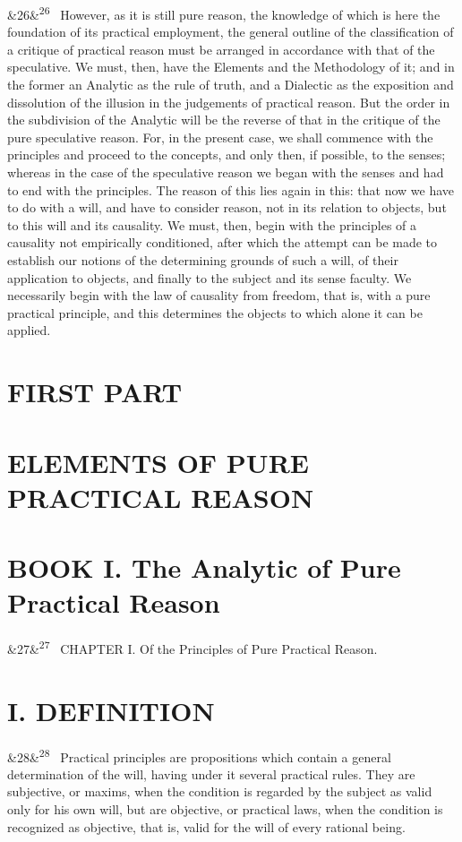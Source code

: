\documentclass[12pt]{article}
\newcommand{\para}[1][]{\par\noindent\ifx&#1&\else\textsuperscript{\footnotesize #1}~\fi}
\begin{document}
\para[26] However, as it is still pure reason, the knowledge of which is here the foundation of its practical employment, the general outline of the classification of a critique of practical reason must be arranged in accordance with that of the speculative. We must, then, have the Elements and the Methodology of it; and in the former an Analytic as the rule of truth, and a Dialectic as the exposition and dissolution of the illusion in the judgements of practical reason. But the order in the subdivision of the Analytic will be the reverse of that in the critique of the pure speculative reason. For, in the present case, we shall commence with the principles and proceed to the concepts, and only then, if possible, to the senses; whereas in the case of the speculative reason we began with the senses and had to end with the principles. The reason of this lies again in this: that now we have to do with a will, and have to consider reason, not in its relation to objects, but to this will and its causality. We must, then, begin with the principles of a causality not empirically conditioned, after which the attempt can be made to establish our notions of the determining grounds of such a will, of their application to objects, and finally to the subject and its sense faculty. We necessarily begin with the law of causality from freedom, that is, with a pure practical principle, and this determines the objects to which alone it can be applied.

\section*{FIRST PART}

\section*{ELEMENTS OF PURE PRACTICAL REASON}

\section*{BOOK I. The Analytic of Pure Practical Reason}

\para[27] CHAPTER I. Of the Principles of Pure Practical Reason.

\section*{I. DEFINITION}

\para[28] Practical principles are propositions which contain a general determination of the will, having under it several practical rules. They are subjective, or maxims, when the condition is regarded by the subject as valid only for his own will, but are objective, or practical laws, when the condition is recognized as objective, that is, valid for the will of every rational being.
\end{document}
